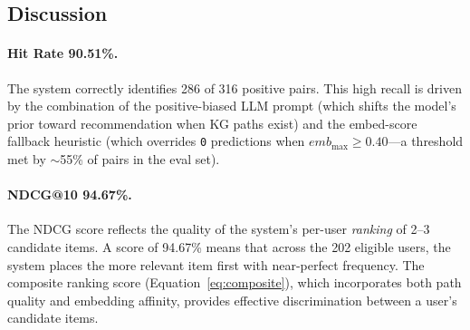 \documentclass[12pt,a4paper]{article}
\begin{document}
\begin{center}
\end{center}

\subsection{Discussion}

\paragraph{Hit Rate 90.51\%.}
The system correctly identifies 286 of 316 positive pairs.
This high recall is driven by the combination of the positive-biased LLM prompt
(which shifts the model's prior toward recommendation when KG paths exist)
and the embed-score fallback heuristic (which overrides \texttt{0} predictions
when $\textit{emb}_{\max} \geq 0.40$---a threshold met by $\sim$55\% of pairs in the eval set).

\paragraph{NDCG@10 94.67\%.}
The NDCG score reflects the quality of the system's per-user \emph{ranking}
of 2--3 candidate items.
A score of 94.67\% means that across the 202 eligible users, the system places
the more relevant item first with near-perfect frequency.
The composite ranking score (Equation~\ref{eq:composite}), which incorporates
both path quality and embedding affinity, provides effective discrimination
between a user's candidate items.
\end{document}
